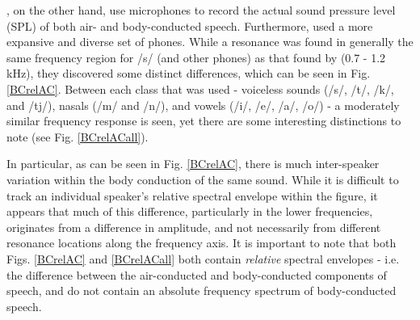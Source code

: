\documentclass[dissertation,copyright]{uathesis}
\begin{document}
\cite{reinfeldt:10}, on the other hand, use microphones to record the actual sound pressure level (SPL) of both air- and body-conducted speech. Furthermore, \cite{reinfeldt:10} used a more expansive and diverse set of phones.  While a resonance was found in generally the same frequency region for /s/ (and other phones) as that found by \cite{porschmann:00} (0.7 - 1.2 kHz), they discovered some distinct differences, which can be seen in Fig. \ref{BCrelAC}. Between each class that was used - voiceless sounds (/s/, /t/, /k/, and /tj/),  nasals (/m/ and /n/), and vowels (/i/, /e/, /a/, /o/) - a moderately similar frequency response is seen, yet there are some interesting distinctions to note (see Fig. \ref{BCrelACall}).

In particular, as can be seen in Fig. \ref{BCrelAC}, there is much inter-speaker variation within the body conduction of the same sound.  While it is difficult to track an individual speaker's relative spectral envelope within the figure, it appears that much of this difference, particularly in the lower frequencies, originates from a difference in amplitude, and not necessarily from different resonance locations along the frequency axis.  It is important to note that both Figs. \ref{BCrelAC} and \ref{BCrelACall} both contain \textit{relative} spectral envelopes - i.e. the difference between the air-conducted and body-conducted components of speech, and do not contain an absolute frequency spectrum of body-conducted speech. 
\end{document}
